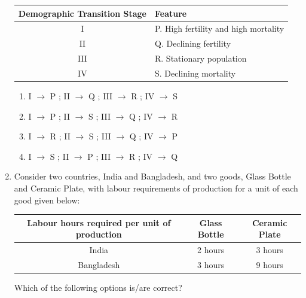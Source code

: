 \documentclass[journal,13pt,onecolumn]{exam}
\theoremstyle{remark}
\begin{document}
\begin{enumerate}[label=Q.\arabic*]
\vspace{0.5em}

\begin{tabular}{|c|m{6cm}|}
\hline
\textbf{Demographic Transition Stage} & \textbf{Feature} \\
\hline
I   & P. High fertility and high mortality \\
\hline
II  & Q. Declining fertility \\
\hline
III & R. Stationary population \\
\hline
IV  & S. Declining mortality \\
\hline
\end{tabular}

\vspace{1em}

\begin{enumerate}
    \item I $\rightarrow$ P ; II $\rightarrow$ Q ; III $\rightarrow$ R ; IV $\rightarrow$ S
    \item I $\rightarrow$ P ; II $\rightarrow$ S ; III $\rightarrow$ Q ; IV $\rightarrow$ R
    \item I $\rightarrow$ R ; II $\rightarrow$ S ; III $\rightarrow$ Q ; IV $\rightarrow$ P
    \item I $\rightarrow$ S ; II $\rightarrow$ P ; III $\rightarrow$ R ; IV $\rightarrow$ Q
\end{enumerate}
\newpage
\item Consider two countries, India and Bangladesh, and two goods, Glass Bottle and Ceramic Plate, with labour requirements of production for a unit of each good given below:

\vspace{1em}

\begin{center}
\begin{tabular}{|c|c|c|}
\hline
\textbf{Labour hours required per unit of production} & \textbf{Glass Bottle} & \textbf{Ceramic Plate} \\
\hline
India & 2 hours & 3 hours \\
\hline
Bangladesh & 3 hours & 9 hours \\
\hline
\end{tabular}
\end{center}

\vspace{1em}

Which of the following options is/are correct?

\vspace{1em}


\end{enumerate}
\end{document}

